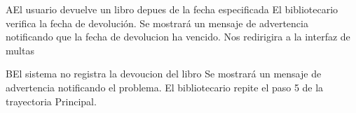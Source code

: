 		\begin{UCtrayectoriaA}{A}{El usuario devuelve un libro depues de la fecha especificada}
			\UCpaso[\UCactor] El bibliotecario verifica la fecha de devolución.
			\UCpaso[\UCsist] Se mostrará un mensaje de advertencia notificando que la fecha de devolucion ha vencido. 
			\UCpaso[\UCsist] Nos redirigira a la interfaz de multas
		\end{UCtrayectoriaA}


		\begin{UCtrayectoriaA}{B}{El sistema no registra la devoucion del libro}
			\UCpaso[\UCsist] Se mostrará un mensaje de advertencia notificando el problema. 
			\UCpaso[\UCactor]El bibliotecario repite el paso 5 de la trayectoria Principal.
		\end{UCtrayectoriaA}
